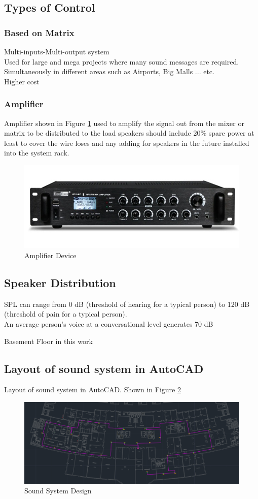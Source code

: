 \documentclass[12pt,fleqn]{book} %
\begin{document}
\subsection{Types of Control}
\subsubsection{Based on Matrix}
Multi-inputs-Multi-output system
\\ Used for large and mega projects where many sound messages are required. Simultaneously in different areas such as Airports, Big Malls ... etc.
\\ Higher cost
\subsubsection{Amplifier}
Amplifier shown in Figure \ref{fig:hamdy 72} used to amplify the signal out from the mixer or matrix to be distributed to the load speakers should include 20\% spare power at least to cover the wire loses and any adding for speakers in the future installed into the system rack.
\begin{figure}[!h]
    \centering
    \includegraphics[width=0.5\linewidth]{hamdy 72.png}
    \caption{Amplifier Device}
    \label{fig:hamdy 72}
    \end{figure}
\subsection{Speaker Distribution}
SPL can range from 0 dB (threshold of hearing for a typical person) to 120 dB (threshold of pain for a typical person).
\\ An average person's voice at a conversational level generates 70 dB
\begin{example}
Basement Floor in this work
\end{example}
\subsection{Layout of sound system in AutoCAD }
Layout of sound system in AutoCAD. Shown in Figure \ref{fig:sound new 1}
\begin{figure}[!h]
    \centering
    \includegraphics[width=1\linewidth]{sound new 1.png}
    \caption{Sound System Design}
    \label{fig:sound new 1}
    \end{figure}
\end{document}
